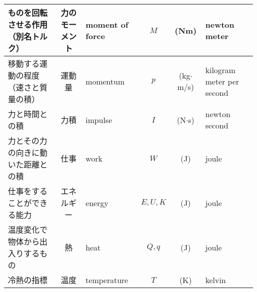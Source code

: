 \documentclass[b5j, landscape]{jarticle}
\begin{document}
\begin{tabular}{|l|c|l|c|c|l|}
ものを回転させる作用（別名トルク）		&力のモーメント	&moment of force			&$M$		&(Nm)		&newton meter					\\ \hline
移動する運動の程度（速さと質量の積）	&運動量			&momentum					&$p$		&(kg$\cdot$m/s)	&kilogram meter per second		\\ \hline
力と時間との積							&力積			&impulse					&$I$		&(N$\cdot$s)		&newton second					\\ \hline
力とその力の向きに動いた距離との積		&仕事			&work						&$W$		&(J)		&joule							\\ \hline
仕事をすることができる能力				&エネルギー		&energy						&$E, U, K$	&(J)		&joule							\\ \hline
温度変化で物体から出入りするもの				&熱		&heat						&$Q, q$	&(J)		&joule							\\ \hline
冷熱の指標				&温度		&temperature						&$T$	&(K)		&kelvin							\\ \hline
\end{tabular}
\end{document}
